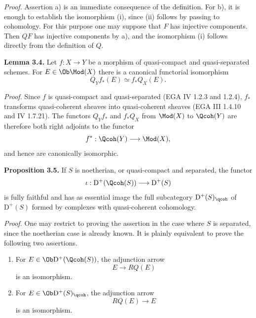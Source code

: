 \emph{Proof.} Assertion a) is an immediate consequence of the definition. For b), it is enough to establish the isomorphism (i), since (ii) follows by passing to cohomology. For this purpose one may suppose that $F$ has injective components. Then $QF$ has injective components by a), and the isomorphism (i) follows directly from the definition of $Q$.

\textbf{Lemma 3.4.} Let $f:X\to Y$ be a morphism of quasi-compact and quasi-separated schemes. For $E\in\Ob\Mod(X)$ there is a canonical functorial isomorphism
\[
 Q_Y f_*(E)\simeq f_*Q_X(E).
\]

\emph{Proof.} Since $f$ is quasi-compact and quasi-separated (EGA IV 1.2.3 and 1.2.4), $f_*$ transforms quasi-coherent sheaves into quasi-coherent sheaves (EGA III 1.4.10 and IV 1.7.21). The functors $Q_Yf_*$ and $f_*Q_X$ from $\Mod(X)$ to $\Qcoh(Y)$ are therefore both right adjoints to the functor
\[
 f^*: \Qcoh(Y)\longrightarrow \Mod(X),
\]
and hence are canonically isomorphic.

\textbf{Proposition 3.5.} If $S$ is noetherian, or quasi-compact and separated, the functor
\[
 \iota:\mathrm D^+(\Qcoh(S))\longrightarrow \mathrm D^+(S)
\]
is fully faithful and has as essential image the full subcategory $\mathrm D^+(S)_{\qcoh}$ of $\mathrm D^+(S)$ formed by complexes with quasi-coherent cohomology.

\emph{Proof.} One may restrict to proving the assertion in the case where $S$ is separated, since the noetherian case is already known. It is plainly equivalent to prove the following two assertions.

\begin{enumerate}[label=(3.5.\arabic*)]
\item For $E\in\Ob\mathrm D^+(\Qcoh(S))$, the adjunction arrow
\[
 E\longrightarrow RQ(E)
\]
is an isomorphism.
\item For $E\in\Ob\mathrm D^+(S)_{\qcoh}$, the adjunction arrow
\[
 RQ(E)\longrightarrow E
\]
is an isomorphism.
\end{enumerate}


